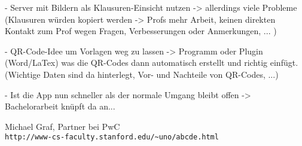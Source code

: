 \documentclass[nomenclature, 150]{HSMW-Thesis}
\begin{document}
	- Server mit Bildern als Klausuren-Einsicht nutzen -> allerdings viele Probleme (Klausuren würden kopiert werden -> Profs mehr Arbeit, keinen direkten Kontakt zum Prof wegen Fragen, Verbesserungen oder Anmerkungen, ... )
	
	- QR-Code-Idee um Vorlagen weg zu lassen -> Programm oder Plugin (Word/LaTex) was die QR-Codes dann automatisch erstellt und richtig einfügt. (Wichtige Daten sind da hinterlegt, Vor- und Nachteile von QR-Codes, ...)
	
	- Ist die App nun schneller als der normale Umgang bleibt offen -> Bachelorarbeit knüpft da an...
	

\Anhang


\begin{thebibliography}{99}
		Michael Graf, Partner bei PwC
		\\\texttt{http://www-cs-faculty.stanford.edu/\~{}uno/abcde.html}
		
\end{thebibliography}
\end{document}
